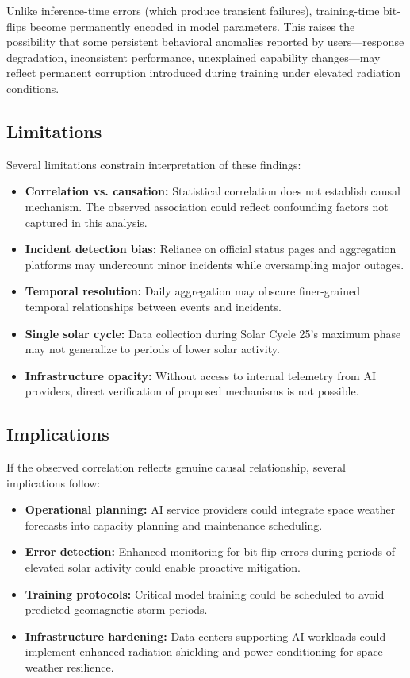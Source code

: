 \documentclass[11pt,a4paper]{article}
\begin{document}
Unlike inference-time errors (which produce transient failures), training-time bit-flips become permanently encoded in model parameters. This raises the possibility that some persistent behavioral anomalies reported by users---response degradation, inconsistent performance, unexplained capability changes---may reflect permanent corruption introduced during training under elevated radiation conditions.

\subsection{Limitations}
Several limitations constrain interpretation of these findings:

\begin{itemize}
\item \textbf{Correlation vs. causation:} Statistical correlation does not establish causal mechanism. The observed association could reflect confounding factors not captured in this analysis.
\item \textbf{Incident detection bias:} Reliance on official status pages and aggregation platforms may undercount minor incidents while oversampling major outages.
\item \textbf{Temporal resolution:} Daily aggregation may obscure finer-grained temporal relationships between events and incidents.
\item \textbf{Single solar cycle:} Data collection during Solar Cycle 25's maximum phase may not generalize to periods of lower solar activity.
\item \textbf{Infrastructure opacity:} Without access to internal telemetry from AI providers, direct verification of proposed mechanisms is not possible.
\end{itemize}

\subsection{Implications}
If the observed correlation reflects genuine causal relationship, several implications follow:

\begin{itemize}
\item \textbf{Operational planning:} AI service providers could integrate space weather forecasts into capacity planning and maintenance scheduling.
\item \textbf{Error detection:} Enhanced monitoring for bit-flip errors during periods of elevated solar activity could enable proactive mitigation.
\item \textbf{Training protocols:} Critical model training could be scheduled to avoid predicted geomagnetic storm periods.
\item \textbf{Infrastructure hardening:} Data centers supporting AI workloads could implement enhanced radiation shielding and power conditioning for space weather resilience.
\end{itemize}
\end{document}
